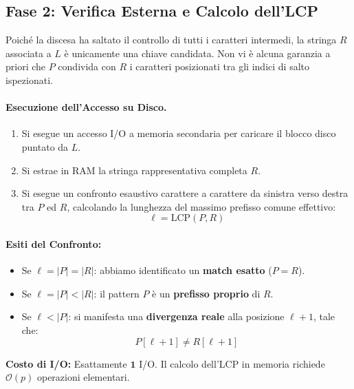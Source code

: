 \FloatBarrier
\subsection{Fase 2: Verifica Esterna e Calcolo dell'LCP}
\label{subsec:fase-2-verifica-esterna}

Poich\'e la discesa ha saltato il controllo di tutti i caratteri intermedi, la stringa $R$ associata a $L$ \`e unicamente una chiave candidata. Non vi \`e alcuna garanzia a priori che $P$ condivida con $R$ i caratteri posizionati tra gli indici di salto ispezionati.

\paragraph{Esecuzione dell'Accesso su Disco.}
\begin{enumerate}
  \item Si esegue un accesso I/O a memoria secondaria per caricare il blocco disco puntato da $L$.
  \item Si estrae in RAM la stringa rappresentativa completa $R$.
  \item Si esegue un confronto esaustivo carattere a carattere da sinistra verso destra tra $P$ ed $R$, calcolando la lunghezza del massimo prefisso comune effettivo:
  \begin{equation}
    \ell = \text{LCP}(P, R)
  \end{equation}
\end{enumerate}

\paragraph{Esiti del Confronto:}
\begin{itemize}
  \item Se $\ell = |P| = |R|$: abbiamo identificato un \textbf{match esatto} ($P = R$).
  \item Se $\ell = |P| < |R|$: il pattern $P$ \`e un \textbf{prefisso proprio} di $R$.
  \item Se $\ell < |P|$: si manifesta una \textbf{divergenza reale} alla posizione $\ell + 1$, tale che:
  \begin{equation}
    P[\ell + 1] \neq R[\ell + 1]
  \end{equation}
\end{itemize}

\textbf{Costo di I/O:} Esattamente $\mathbf{1}$ I/O. Il calcolo dell'LCP in memoria richiede $\mathcal{O}(p)$ operazioni elementari.

